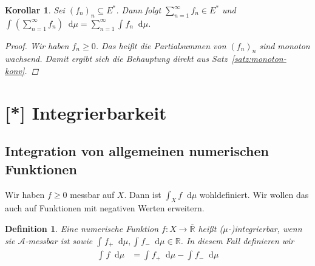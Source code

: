 \documentclass[11pt, twoside, a4paper]{article}
\theoremstyle{plain}
\newtheorem{definition}[blockelement]{Definition}
\newtheorem{korollar}[blockelement]{Korollar}
\numberwithin{equation}{subsection}
\newcommand{\pair}[1]{\left(#1\right)}
\newcommand{\dif}{\mathop{}\!\mathrm{d}}
\newcommand{\dsty}{\displaystyle}
\newcommand{\R}{\mathbb{R}}
\newcommand{\mA}{\mathcal{A}}
\begin{document}
    \begin{korollar}
        Sei $(f_n)_n \subseteq E^{\ast}$. Dann folgt $\dsty \sum_{n=1}^{\infty} f_n \in E^{\ast}$ und $\dsty \int_{}^{} \pair{ \sum_{n=1}^{\infty} f_n} \dif \mu = \sum_{n=1}^{\infty} \int_{}^{} f_n \dif \mu$.
        \begin{proof}
            Wir haben $f_n \geq 0$. Das heißt die Partialsummen von $(f_n)_n$ sind monoton wachsend. Damit ergibt sich die Behauptung direkt aus Satz~\ref{satz:monoton-konv}.
        \end{proof}
    \end{korollar}

    \newpage


    \section{[*] Integrierbarkeit}

    \subsection{Integration von allgemeinen numerischen Funktionen}
    \thispagestyle{pagenumberonly}

    Wir haben $f\geq 0$ messbar auf $X$. Dann ist $\dsty \int_{X}^{} f \dif \mu$ wohldefiniert. Wir wollen das auch auf Funktionen mit negativen Werten erweitern.

    \begin{definition}
        Eine numerische Funktion $f: X\to\overline{\R}$ heißt ($\mu$-)integrierbar, wenn sie $\mA$-messbar ist sowie $ \int_{}^{} f_+ \dif \mu, \int_{}^{} f_- \dif \mu\in\R$. In diesem Fall definieren wir
        \begin{align*}
            \int_{}^{} f \dif \mu &= \int_{}^{} f_+ \dif \mu - \int_{}^{} f_- \dif \mu
        \end{align*}
    \end{definition}
\end{document}
